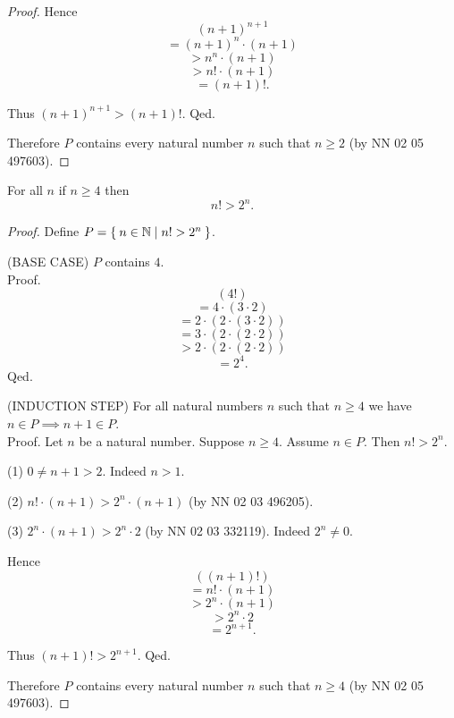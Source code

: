 \documentclass[../../natural-numbers.ftl.tex]{subfiles}
\begin{document}
\begin{forthel}
\begin{proof}
        Hence
        \[   (n + 1)^{n + 1} \]
        \[ = (n + 1)^{n} \cdot (n + 1) \]
        \[ > n^{n} \cdot (n + 1) \]
        \[ > n! \cdot (n + 1) \]
        \[ = (n + 1)!. \]

        Thus $(n + 1)^{n + 1} > (n + 1)!$.
      Qed.

      Therefore $P$ contains every natural number $n$ such that $n \geq 2$ (by NN 02 05 497603).
    \end{proof}


    \begin{proposition}[NN 02 06 493411]
      For all $n$ if $n \geq 4$ then \[ n! > 2^{n}. \]
    \end{proposition}
    \begin{proof}
      Define $P = \Set{n \in \mathbb{N} | n! > 2^{n}}$.

      (BASE CASE) $P$ contains $4$. \\
      Proof.
        \[   (4!) \]
        \[ = 4 \cdot (3 \cdot 2) \]
        \[ = 2 \cdot (2 \cdot (3 \cdot 2)) \]
        \[ = 3 \cdot (2 \cdot (2 \cdot 2)) \]
        \[ > 2 \cdot (2 \cdot (2 \cdot 2)) \]
        \[ = 2^{4}. \]
      Qed.

      (INDUCTION STEP) For all natural numbers $n$ such that $n \geq 4$ we have $n \in P \implies n + 1 \in P$. \\
      Proof.
        Let $n$ be a natural number.
        Suppose $n \geq 4$.
        Assume $n \in P$.
        Then $n! > 2^{n}$.

        (1) $0 \neq n + 1 > 2$.
        Indeed $n > 1$.

        (2) $n! \cdot (n + 1) > 2^{n} \cdot (n + 1)$ (by NN 02 03 496205).

        (3) $2^{n} \cdot (n + 1) > 2^{n} \cdot 2$ (by NN 02 03 332119).
        Indeed $2^{n} \neq 0$.

        Hence
        \[   ((n + 1)!) \]
        \[ = n! \cdot (n + 1) \]
        \[ > 2^{n} \cdot (n + 1) \]
        \[ > 2^{n} \cdot 2 \]
        \[ = 2^{n + 1}. \]

        Thus $(n + 1)! > 2^{n + 1}$.
      Qed.

      Therefore $P$ contains every natural number $n$ such that $n \geq 4$ (by NN 02 05 497603).
    \end{proof}
  \end{forthel}
\end{document}
